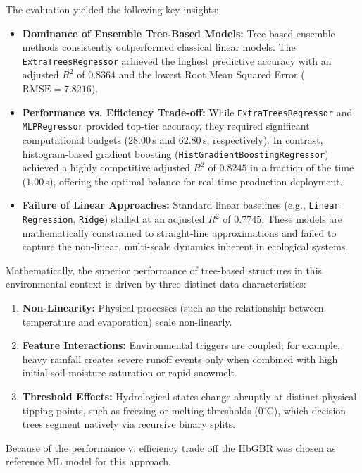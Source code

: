 \documentclass[a4paper,12pt]{article}
\begin{document}
The evaluation yielded the following key insights:
\begin{itemize}
    \item \textbf{Dominance of Ensemble Tree-Based Models:} Tree-based ensemble methods consistently outperformed classical linear models. The \texttt{ExtraTreesRegressor} achieved the highest predictive accuracy with an adjusted $R^2$ of $0.8364$ and the lowest Root Mean Squared Error ($\text{RMSE} = 7.8216$). 
    \item \textbf{Performance vs. Efficiency Trade-off:} While \texttt{ExtraTreesRegressor} and \texttt{MLPRegressor} provided top-tier accuracy, they required significant computational budgets ($28.00$\,s and $62.80$\,s, respectively). In contrast, histogram-based gradient boosting (\texttt{HistGradientBoostingRegressor}) achieved a highly competitive adjusted $R^2$ of $0.8245$ in a fraction of the time ($1.00$\,s), offering the optimal balance for real-time production deployment.
    \item \textbf{Failure of Linear Approaches:} Standard linear baselines (e.g., \texttt{Linear Regression}, \texttt{Ridge}) stalled at an adjusted $R^2$ of $0.7745$. These models are mathematically constrained to straight-line approximations and failed to capture the non-linear, multi-scale dynamics inherent in ecological systems.
\end{itemize}

\noindent Mathematically, the superior performance of tree-based structures in this environmental context is driven by three distinct data characteristics:
\begin{enumerate}
    \item \textbf{Non-Linearity:} Physical processes (such as the relationship between temperature and evaporation) scale non-linearly.
    \item \textbf{Feature Interactions:} Environmental triggers are coupled; for example, heavy rainfall creates severe runoff events only when combined with high initial soil moisture saturation or rapid snowmelt.
    \item \textbf{Threshold Effects:} Hydrological states change abruptly at distinct physical tipping points, such as freezing or melting thresholds ($0^\circ\text{C}$), which decision trees segment natively via recursive binary splits.
\end{enumerate}

Because of the performance v. efficiency trade off the HbGBR was chosen as reference ML model for this approach.
\end{document}
